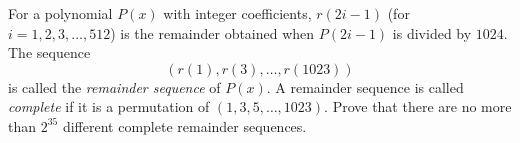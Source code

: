 For a polynomial $ P(x)$ with integer coefficients, $ r(2i - 1)$ (for $ i = 1,2,3,\ldots,512$) is the remainder obtained when $ P(2i - 1)$ is divided by $ 1024$. The sequence \[ (r(1),r(3),\ldots,r(1023))\] is called the \emph{remainder sequence} of $ P(x)$. A remainder sequence is called \emph{complete} if it is a permutation of $ (1,3,5,\ldots,1023)$. Prove that there are no more than $ 2^{35}$ different complete remainder sequences.